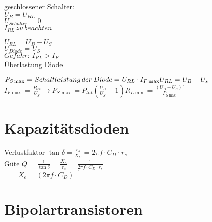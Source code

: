     \begin{minipage}{0.2\columnwidth}
        geschlossener Schalter:\\
        $U_B=U_{RL}$\\
        $U_{Schalter}=0$\\
        $I_{RL}\, zu\, beachten$
    \end{minipage}
    \begin{minipage}{0.5\columnwidth}
    \end{minipage}
    \begin{minipage}{0.3\columnwidth}
        $U_{RL}=U_B-U_S$\\
        $U_{Diode}=U_S$\\
        $Gefahr:\, I_{RL}>I_F$\\
        Überlastung Diode
    \end{minipage}

    $P_{S\max}=Schaltleistung\, der\, Diode=U_{RL}\cdot I_{F\max}\\
    U_{RL}=U_B-U_s$\hspace*{1cm}$I_{F\max}=\frac{P_{tot}}{U_S}\longrightarrow P_{S\max}=P_{tot}(\frac{U_B}{U_S}-1)$\hspace*{1cm}$R_{L\min}=\frac{(U_B-U_S)^2}{P_{S\max}}$

    \section{Kapazitätsdioden}
    \begin{minipage}{0.3\columnwidth}
    \end{minipage}
    \begin{minipage}{0.6\columnwidth}
        Verlustfaktor $\tan\delta=\frac{r_s}{X_C}=2\pi f\cdot C_D\cdot r_s$\\ Güte $Q=\frac{1}{\tan\delta}=\frac{X_C}{r_s}=\frac{1}{2\pi f\cdot C_D\cdot r_s}$\\
        $\quad\quad X_e=(2\pi f\cdot C_D)^{-1}$\\
        
    \end{minipage}

    \section{Bipolartransistoren}
    

